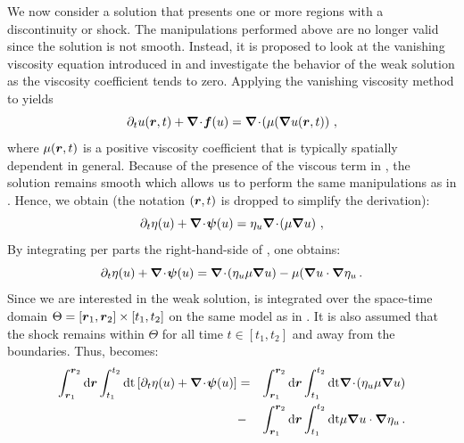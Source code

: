 We now consider a solution that presents one or more regions with a discontinuity or shock. The manipulations performed above are no longer valid since the solution is not smooth. Instead, it is proposed to look at the vanishing viscosity equation introduced in  and investigate the behavior of the weak solution as the viscosity coefficient tends to zero. Applying the vanishing viscosity method to  yields
%
\begin{equation}\label{eq:weak_sol7_sct1b}
\partial_t u( \boldsymbol r, t) + \boldsymbol{\nabla}\! \cdot \! \boldsymbol f(u) = \boldsymbol{\nabla}\! \cdot \! \left( \mu( \boldsymbol{\nabla} u( \boldsymbol r, t) \right) \,,
\end{equation}
%
where $\mu(\boldsymbol r,t )$ is a positive viscosity coefficient that is typically spatially dependent in general. Because of the presence of the viscous term in , the solution remains smooth which allows us to perform the same manipulations as in . Hence, we obtain (the notation $( \boldsymbol r, t)$ is dropped to simplify the derivation):
%
\begin{equation}\label{eq:weak_sol8_sct1b}
\partial_t \eta (u) + \boldsymbol{\nabla}\! \cdot \! \boldsymbol\psi (u) = \eta_u \boldsymbol{\nabla}\! \cdot \! \left( \mu \boldsymbol{\nabla} u \right) \,,
\end{equation}
%
By integrating per parts the right-hand-side of , one obtains: 
%
\begin{equation}\label{eq:weak_sol9_sct1b}
\partial_t \eta (u) + \boldsymbol{\nabla}\! \cdot \! \boldsymbol\psi (u) =  \boldsymbol{\nabla}\! \cdot \! \left( \eta_u \mu \boldsymbol{\nabla} u \right) - \mu( \boldsymbol{\nabla} u \cdot \boldsymbol{\nabla} \eta_u \,.
\end{equation}
%
Since we are interested in the weak solution,  is integrated over the space-time domain $\Theta = \left[ \boldsymbol r_1,\boldsymbol r_2 \right] \times \left[ t_1,t_2 \right]$ on the same model as in . It is also assumed that the shock remains within $\Theta$ for all time $t \in \left[ t_1, t_2 \right]$ and away from the boundaries. Thus,  becomes:
%
\begin{eqnarray}\label{eq:weak_sol10_sct1b}
\int_{\boldsymbol r_1}^{\boldsymbol r_2}\text{d} \boldsymbol r \int_{t_1}^{t_2} \text{dt} \left[ \partial_t \eta (u) + \boldsymbol{\nabla}\! \cdot \! \boldsymbol\psi (u) \right] &=&
\int_{\boldsymbol r_1}^{\boldsymbol r_2}\text{d} \boldsymbol r \int_{t_1}^{t_2}\text{dt}  \boldsymbol{\nabla}\! \cdot \! \left( \eta_u \mu \boldsymbol{\nabla} u \right)    \nonumber \\
&-& \int_{\boldsymbol r_1}^{\boldsymbol r_2}\text{d} \boldsymbol r \int_{t_1}^{t_2} \text{dt} \mu \boldsymbol{\nabla} u \cdot \boldsymbol{\nabla} \eta_u \,.
\end{eqnarray}
